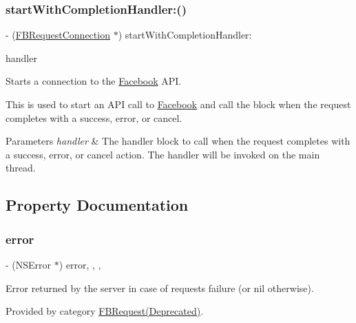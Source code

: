 \subsubsection{\texorpdfstring{start\+With\+Completion\+Handler\+:()}{startWithCompletionHandler:()}\hspace{0.1cm}{\footnotesize\ttfamily [5/5]}}
{\footnotesize\ttfamily -\/ (\hyperlink{interfaceFBRequestConnection}{F\+B\+Request\+Connection} $\ast$) start\+With\+Completion\+Handler\+: \begin{DoxyParamCaption}\item[{(F\+B\+Request\+Handler)}]{handler }\end{DoxyParamCaption}}

Starts a connection to the \hyperlink{interfaceFacebook}{Facebook} A\+PI.

This is used to start an A\+PI call to \hyperlink{interfaceFacebook}{Facebook} and call the block when the request completes with a success, error, or cancel.


\begin{DoxyParams}{Parameters}
{\em handler} & The handler block to call when the request completes with a success, error, or cancel action. The handler will be invoked on the main thread. \\
\hline
\end{DoxyParams}


\subsection{Property Documentation}
\mbox{\label{interfaceFBRequest_aa77c503e3a8a4141487e3593fc285927}} 
\subsubsection{\texorpdfstring{error}{error}}
{\footnotesize\ttfamily -\/ (N\+S\+Error $\ast$) error\hspace{0.3cm}{\ttfamily [read]}, {\ttfamily [write]}, {\ttfamily [nonatomic]}, {\ttfamily [retain]}}

Error returned by the server in case of request\textquotesingle{}s failure (or nil otherwise). 

Provided by category \hyperlink{categoryFBRequest_07Deprecated_08_aa77c503e3a8a4141487e3593fc285927}{F\+B\+Request(\+Deprecated)}.

